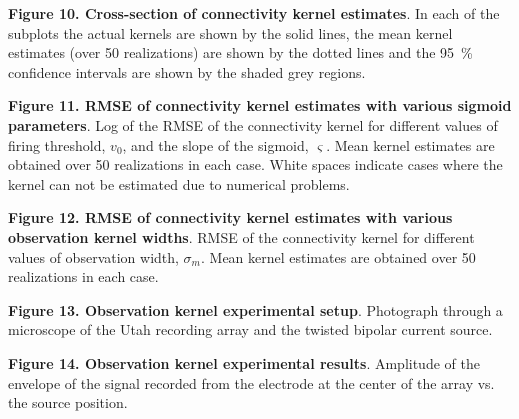 \documentclass[5p,authoryear]{elsarticle}
\begin{document}
{\bf Figure 10. Cross-section of connectivity kernel estimates}. In each of the subplots the actual kernels are shown by the solid lines, the mean kernel estimates (over 50 realizations) are shown by the dotted lines and the 95~\% confidence intervals are shown by the shaded grey regions.

{\bf Figure 11. RMSE of connectivity kernel estimates with various sigmoid parameters}. Log of the RMSE of the connectivity kernel for different values of firing threshold, $v_0$, and the slope of the sigmoid, $\varsigma$. Mean kernel estimates are obtained over 50 realizations in each case. White spaces indicate cases where the kernel can not be estimated due to numerical problems.

{\bf Figure 12. RMSE of connectivity kernel estimates with various observation kernel widths}. RMSE of the connectivity kernel for different values of observation width, $\sigma_m$. Mean kernel estimates are obtained over 50 realizations in each case.

{\bf Figure 13. Observation kernel experimental setup}. Photograph through a microscope of the Utah recording array and the twisted bipolar current source.

{\bf Figure 14. Observation kernel experimental results}. Amplitude of the envelope of the signal recorded from the electrode at the center of the array vs. the source position.
\end{document}

